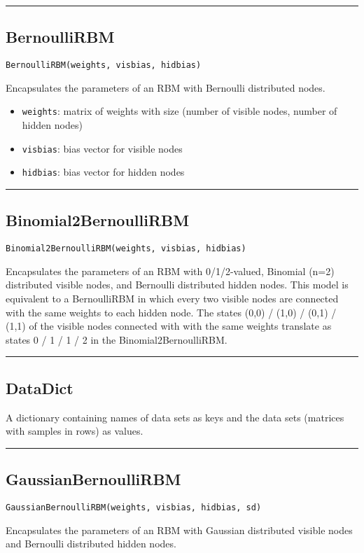 \noindent\rule{\textwidth}{1pt}
\subsection*{BernoulliRBM}
\begin{verbatim}
BernoulliRBM(weights, visbias, hidbias)
\end{verbatim}
Encapsulates the parameters of an RBM with Bernoulli distributed nodes.

\begin{itemize}
\item \texttt{weights}: matrix of weights with size (number of visible nodes, number of hidden nodes)


\item \texttt{visbias}: bias vector for visible nodes


\item \texttt{hidbias}: bias vector for hidden nodes

\end{itemize}
\noindent\rule{\textwidth}{1pt}
\subsection*{Binomial2BernoulliRBM}
\begin{verbatim}
Binomial2BernoulliRBM(weights, visbias, hidbias)
\end{verbatim}
Encapsulates the parameters of an RBM with 0/1/2-valued, Binomial (n=2) distributed visible nodes, and Bernoulli distributed hidden nodes. This model is equivalent to a BernoulliRBM in which every two visible nodes are connected with the same weights to each hidden node. The states (0,0) / (1,0) / (0,1) / (1,1) of the visible nodes connected with with the same weights translate as states 0 / 1 / 1 / 2 in the Binomial2BernoulliRBM.

\noindent\rule{\textwidth}{1pt}
\subsection*{DataDict}
A dictionary containing names of data sets as keys and the data sets (matrices with samples in rows) as values.

\noindent\rule{\textwidth}{1pt}
\subsection*{GaussianBernoulliRBM}
\begin{verbatim}
GaussianBernoulliRBM(weights, visbias, hidbias, sd)
\end{verbatim}
Encapsulates the parameters of an RBM with Gaussian distributed visible nodes and Bernoulli distributed hidden nodes.

